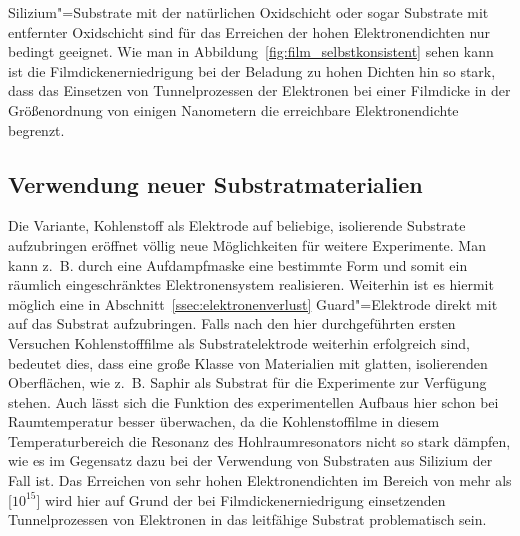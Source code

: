 Silizium"=Substrate mit der natürlichen Oxidschicht oder sogar Substrate mit entfernter Oxidschicht sind für das Erreichen der hohen Elektronendichten nur bedingt geeignet. Wie man in Abbildung~\ref{fig:film_selbstkonsistent} sehen kann ist die Filmdickenerniedrigung bei der Beladung zu hohen Dichten hin so stark, dass das Einsetzen von Tunnelprozessen der Elektronen bei einer Filmdicke in der Größenordnung von einigen Nanometern die erreichbare Elektronendichte begrenzt.

\subsection*{Verwendung neuer Substratmaterialien}
Die Variante, Kohlenstoff als Elektrode auf beliebige, isolierende Substrate aufzubringen eröffnet völlig neue Möglichkeiten für weitere Experimente. Man kann z.~B. durch eine Aufdampfmaske eine bestimmte Form und somit ein räumlich eingeschränktes Elektronensystem realisieren. Weiterhin ist es hiermit möglich eine in Abschnitt~\ref{ssec:elektronenverlust} Guard"=Elektrode direkt mit auf das Substrat aufzubringen.
Falls nach den hier durchgeführten ersten Versuchen Kohlenstofffilme als Substratelektrode weiterhin erfolgreich sind, bedeutet dies, dass eine große Klasse von Materialien mit glatten, isolierenden Oberflächen, wie z.~B. Saphir als Substrat für die Experimente zur Verfügung stehen. Auch lässt sich die Funktion des experimentellen Aufbaus hier schon bei Raumtemperatur besser überwachen, da die Kohlenstoffilme in diesem Temperaturbereich die Resonanz des Hohlraumresonators nicht so stark dämpfen, wie es im Gegensatz dazu bei der Verwendung von Substraten aus Silizium der Fall ist.
Das Erreichen von sehr hohen Elektronendichten im Bereich von mehr als \unit[$10^{15}$]{\Em} wird hier auf Grund der bei Filmdickenerniedrigung einsetzenden Tunnelprozessen von Elektronen in das leitfähige Substrat problematisch sein.
